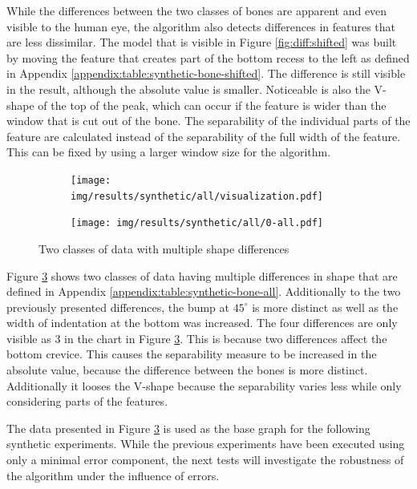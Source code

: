 \documentclass[pdftex,12pt,a4paper]{report}
\begin{document}
While the differences between the two classes of bones are apparent and even visible to the human eye, the algorithm also detects differences in features that are less dissimilar. The model that is visible in Figure \ref{fig:diff:shifted} was built by moving the feature that creates part of the bottom recess to the left as defined in Appendix \ref{appendix:table:synthetic-bone-shifted}. The difference is still visible in the result, although the absolute value is smaller. Noticeable is also the V-shape of the top of the peak, which can occur if the feature is wider than the window that is cut out of the bone. The separability of the individual parts of the feature are calculated instead of the separability of the full width of the feature. This can be fixed by using a larger window size for the algorithm.

\begin{figure}[h]
	\centering
	\begin{subfigure}[b]{0.45\textwidth}
		\centering
		\texttt{[image: img/results/synthetic/all/visualization.pdf]}
		\subcaption*{}
		\label{fig:diff:all}
	\end{subfigure}
	\begin{subfigure}[b]{0.45\textwidth}
		\centering
		\texttt{[image: img/results/synthetic/all/0-all.pdf]}
		\subcaption*{}
		\label{}
	\end{subfigure}
	\caption{Two classes of data with multiple shape differences}
	\label{fig:all}
\end{figure}

Figure \ref{fig:all} shows two classes of data having multiple differences in shape that are defined in Appendix \ref{appendix:table:synthetic-bone-all}. Additionally to the two previously presented differences, the bump at $45^\circ$ is more distinct as well as the width of indentation at the bottom was increased. The four differences are only visible as 3 in the chart in Figure \ref{fig:all}. This is because two differences affect the bottom crevice. This causes the separability measure to be increased in the absolute value, because the difference between the bones is more distinct. Additionally it looses the V-shape because the separability varies less while only considering parts of the features.

The data presented in Figure \ref{fig:all} is used as the base graph for the following synthetic experiments. While the previous experiments have been executed using only a minimal error component, the next tests will investigate the robustness of the algorithm under the influence of errors.
\end{document}
